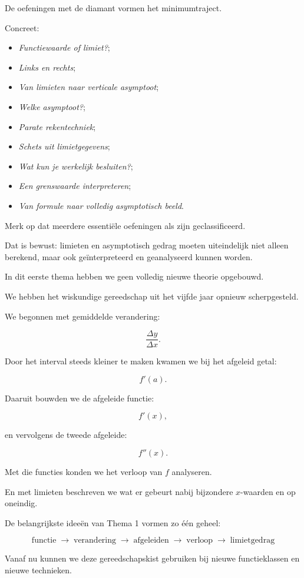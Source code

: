 \documentclass{ximera}
\begin{document}
\begin{opmerking}
De oefeningen met de diamant vormen het minimumtraject.

Concreet:

\begin{itemize}
  \item \textit{Functiewaarde of limiet?};
  \item \textit{Links en rechts};
  \item \textit{Van limieten naar verticale asymptoot};
  \item \textit{Welke asymptoot?};
  \item \textit{Parate rekentechniek};
  \item \textit{Schets uit limietgegevens};
  \item \textit{Wat kun je werkelijk besluiten?};
  \item \textit{Een grenswaarde interpreteren};
  \item \textit{Van formule naar volledig asymptotisch beeld}.
\end{itemize}

Merk op dat meerdere essentiële oefeningen als \oefU{} zijn
geclassificeerd.

Dat is bewust: limieten en asymptotisch gedrag moeten uiteindelijk
niet alleen berekend, maar ook geïnterpreteerd en geanalyseerd
kunnen worden.
\end{opmerking}




In dit eerste thema hebben we geen volledig nieuwe theorie opgebouwd.

We hebben het wiskundige gereedschap uit het vijfde jaar opnieuw
scherpgesteld.

We begonnen met gemiddelde verandering:

\[
\frac{\Delta y}{\Delta x}.
\]

Door het interval steeds kleiner te maken kwamen we bij het afgeleid
getal:

\[
f'(a).
\]

Daaruit bouwden we de afgeleide functie:

\[
f'(x),
\]

en vervolgens de tweede afgeleide:

\[
f''(x).
\]

Met die functies konden we het verloop van $f$ analyseren.

En met limieten beschreven we wat er gebeurt nabij bijzondere
$x$-waarden en op oneindig.

De belangrijkste ideeën van Thema 1 vormen zo één geheel:

\[
\boxed{
\text{functie}
\;\longrightarrow\;
\text{verandering}
\;\longrightarrow\;
\text{afgeleiden}
\;\longrightarrow\;
\text{verloop}
\;\longrightarrow\;
\text{limietgedrag}
}
\]

Vanaf nu kunnen we deze gereedschapskist gebruiken bij nieuwe
functieklassen en nieuwe technieken.
\end{document}
